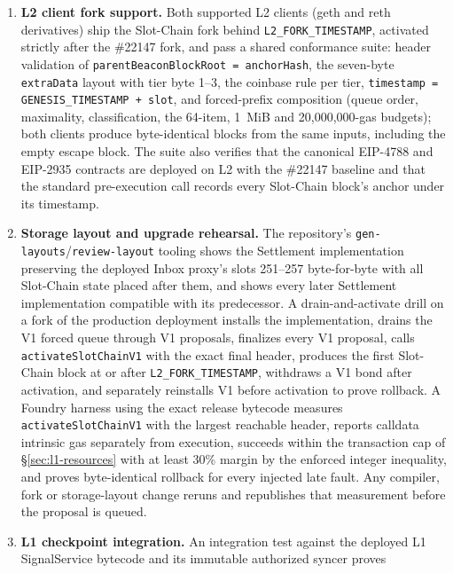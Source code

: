 \documentclass[a4paper,11pt]{article}
\newcommand{\code}[1]{\nolinkurl{#1}}
\begin{document}
\begin{enumerate}
escape block, and kind-0 classification: one vector per disposition code
0, 1, 2, 3, 6 and 4 and one per evaluation-order boundary, each proving that
the consumed item leaves no transaction and that the prefix is maximal.
\item \textbf{L2 client fork support.} Both supported L2 clients (geth and
reth derivatives) ship the Slot-Chain fork behind \code{L2_FORK_TIMESTAMP},
activated strictly after the \#22147 fork, and pass a shared conformance
suite: header validation of \code{parentBeaconBlockRoot = anchorHash},
the seven-byte \code{extraData} layout with tier byte 1--3, the coinbase rule
per tier, \code{timestamp = GENESIS_TIMESTAMP + slot}, and forced-prefix
composition (queue order, maximality, classification, the 64-item, 1~MiB and
20,000,000-gas budgets); both clients produce byte-identical blocks from the
same inputs, including the empty escape block.  The suite also verifies that
the canonical EIP-4788 and EIP-2935 contracts are deployed on L2 with the
\#22147 baseline and that the standard pre-execution call records every
Slot-Chain block's anchor under its timestamp.
\item \textbf{Storage layout and upgrade rehearsal.} The repository's
\code{gen-layouts}/\code{review-layout} tooling shows the Settlement
implementation preserving the deployed Inbox proxy's slots 251--257
byte-for-byte with all Slot-Chain state placed after them, and shows every
later Settlement implementation compatible with its predecessor.  A
drain-and-activate drill on a fork of the production deployment installs the
implementation, drains the V1 forced queue through V1 proposals, finalizes
every V1 proposal, calls \code{activateSlotChainV1} with the exact final
header, produces the first Slot-Chain block at or after
\code{L2_FORK_TIMESTAMP}, withdraws a V1 bond after activation, and separately
reinstalls V1 before activation to prove rollback.  A Foundry harness using
the exact release bytecode measures \code{activateSlotChainV1} with the
largest reachable header, reports calldata intrinsic gas separately from
execution, succeeds within the transaction cap of \S\ref{sec:l1-resources}
with at least 30\% margin by the enforced integer inequality, and proves
byte-identical rollback for every injected late fault.  Any compiler, fork or
storage-layout change reruns and republishes that measurement before the
proposal is queued.
\item \textbf{L1 checkpoint integration.} An integration test against the
deployed L1 SignalService bytecode and its immutable authorized syncer proves

\end{enumerate}
\end{document}
